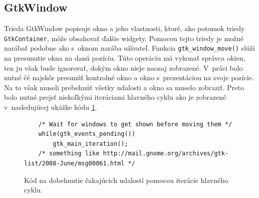 \documentclass[12pt,oneside,final]{fithesis2}
\begin{document}
\subsection{GtkWindow}
Trieda GtkWindow popisuje okno a jeho vlastnosti, ktoré, ako potomok triedy \texttt{GtkContainer}, môže obsahovať ďalšie widgety. Pomocou tejto triedy je možné narábať podobne ako s~oknom narába užívateľ. Funkcia \texttt{gtk\_\-window\_\-move()} slúži na presunutie okna na danú pozíciu. Túto operáciu má vykonať správca okien, ten ju však bude ignorovať, dokým okno nieje naozaj zobrazené. V~práci bolo nutné čé najskôr presunúť kontrolné okno a okno s~prezentáciou na svoje pozície. Na to však museli prebehnúť všetky udalosti a okno sa muselo zobraziť. Preto bolo nutné prejsť niekoľkými iteráciami hlavného cyklu ako je zobrazené v~nasledujúcej ukážke kódu \ref{iterate}.
\begin{figure}[hbtp]
\begin{tiny}
\begin{verbatim}
    /* Wait for windows to get shown before moving them */
    while(gtk_events_pending())
        gtk_main_iteration();
    /* something like http://mail.gnome.org/archives/gtk-list/2008-June/msg00061.html */
\end{verbatim}
\end{tiny}
\caption{Kód na dobehnutie čakajúcich udalostí pomocou iterácie hlavného cyklu.}
\label{iterate}
\end{figure}
\end{document}
